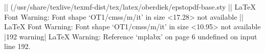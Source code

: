 || (/usr/share/texlive/texmf-dist/tex/latex/oberdiek/epstopdf-base.sty
|| LaTeX Font Warning: Font shape `OT1/cmss/m/it' in size <17.28> not available
|| LaTeX Font Warning: Font shape `OT1/cmss/m/it' in size <10.95> not available
|192 warning| LaTeX Warning: Reference `mplabx' on page 6 undefined on input line 192.
